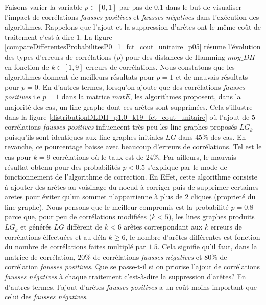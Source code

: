 \documentclass[onecolumn, 12pt]{book}
\begin{document}
Faisons varier la variable $p \in [0,1]$ par pas de $0.1$ dans le but de visualiser l'impact de corr\'elations {\em fausses positives} et {\em fausses n\'egatives} dans l'ex\'ecution des algorithmes. Rappelons que l'ajout et la suppression d'ar\^etes ont le m\^eme co\^ut de traitement c'est-\`a-dire $1$.
La figure \ref{compareDifferentesProbabilitesP0_1_fct_cout_unitaire_p05} r\'esume l'\'evolution des types d'erreurs de corr\'elations ($p$) pour des distances de Hamming $moy\_DH$ en fonction de  $k \in [1, 9]$  erreurs de corr\'elations.
\newline 
Nous constatons que les algorithmes donnent de meilleurs r\'esultats pour $p = 1$ et de mauvais r\'esultats pour $p = 0$. 
En d'autres termes, lorsqu'on ajoute que des corr\'elations {\em fausses positives} i.e $p  = 1$ dans la matrice $matE$, les algorithmes  proposent, dans la majorit\'e des cas, un line graphe dont ces ar\^etes sont supprim\'ees. Cela s'illustre dans la figure \ref{distributionDLDH_p1.0_k19_fct_cout_unitaire} o\`u l'ajout de $5$ corr\'elations {\em fausses positives} influencent tr\`es peu les line graphes propos\'es $LG_{k}$ puisqu'ils sont identiques aux line graphes initiales $LG$ dans $45\%$ des cas. 
En revanche, ce pourcentage baisse avec beaucoup d'erreurs de corr\'elations. Tel est le cas pour $k = 9$ corr\'elations o\`u le taux est de $24\%$. 
\newline
Par ailleurs, le mauvais r\'esultat obtenu pour des probabilit\'es $p < 0.5$ s'explique par le mode de fonctionnement de l'algorithme de correction. En Effet, cette algorithme consiste \`a ajouter des ar\^etes au voisinage du noeud \`a corriger puis de supprimer certaines aretes pour \'eviter qu'un sommet n'appartienne \`a plus de $2$ cliques (propriet\'e du line graphe).
\newline
Nous pensons que le meilleur compromis est la probabilit\'e $p = 0.8$ parce que, pour peu de corr\'elations modifi\'ees ($k<5$), les lines graphes produits $LG_k$ et g\'en\'er\'es $LG$ diff\`erent de $k<6$ ar\^etes correspondant aux $k$ erreurs de  corr\'elations \'effectu\'ees  et au d\'ela $k \geq 6$, le nombre d'ar\^etes diff\'erentes est fonction du nombre de corr\'elations faites multipl\'e par $1.5$.
Cela signifie qu'il faut, dans la matrice de corr\'elation, $20\%$ de corr\'elations {\em fausses n\'egatives} et $80\%$ de corr\'elation {\em fausses positives}. 
\newline
Que se passe-t-il si on priorise l'ajout de corr\'elations {\em fausses n\'egatives} \`a chaque traitement c'est-\`a-dire la suppression d'ar\^etes?  
En d'autres termes, l'ajout d'ar\^etes {\em fausses positives} a un co\^ut moins important que celui des {\em fausses n\'egatives}. 
\end{document}
